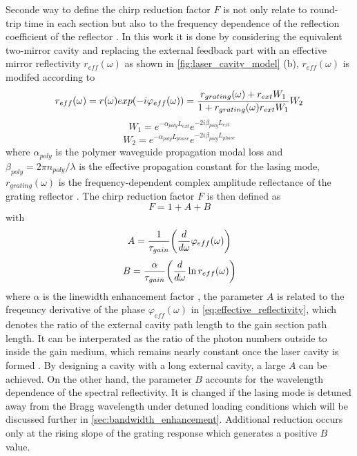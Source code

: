 Seconde way to define the chirp reduction factor $F$ is not only relate to round-trip time in each section but also to the frequency dependence of the reflection coefficient of the reflector \cite{petermann2012laser}. In this work it is done by considering the equivalent two-mirror cavity and replacing the external feedback part with an effective mirror reflectivity $r_{eff}(\omega)$ as shown in \autoref{fig:laser_cavity_model} (b), $r_{eff}(\omega)$ is modifed according to \cite{kazarinov1987relation, coldren2012diode, komljenovic2015widely}
\begin{equation}
    r_{eff}(\omega)=r(\omega)exp\qty(-i\varphi_{eff}(\omega))=\frac{r_{grating}(\omega)+r_{ext}W_1}{1+r_{grating}(\omega)r_{ext}W_1}W_2
    \label{eq:effective_reflectivity}
\end{equation}
\begin{equation}
    W_1=e^{-\alpha_{poly}L_{ext}}e^{-2i\beta_{poly}L_{ext}}
    \label{eq:propogation_external_cavity}
\end{equation}
\begin{equation}
    W_2=e^{-\alpha_{poly}L_{phase}}e^{-2i\beta_{poly}L_{phase}}
    \label{eq:propogation_polymer_wg}
\end{equation}
where $\alpha_{poly}$ is the polymer waveguide propagation modal loss and $\beta_{poly}=2\pi n_{poly}/\lambda$ is the effective propagation constant for the lasing mode, $r_{grating}(\omega)$ is the frequency-dependent complex amplitude reflectance of the grating reflector \cite{yariv1977periodic}.
The chirp reduction factor $F$ is then defined as \cite{kazarinov1987relation, petermann2012laser}
\begin{equation}
    F=1+A+B
    \label{eq:F_factor}
\end{equation}
with
\begin{equation}
    A=\frac{1}{\tau_{gain}}\qty(\dv{\omega}\varphi_{eff}(\omega))
    \label{eq:F_factor_A}
\end{equation}
\begin{equation}
    B=\frac{\alpha}{\tau_{gain}}\qty(\dv{\omega}\ln{r_{eff}(\omega)})
    \label{eq:F_factor_B}
\end{equation}
where $\alpha$ is the linewidth enhancement factor \cite{henry1982theory}, the parameter $A$ is related to the freqeuncy derivative of the phase $\varphi_{eff}(\omega)$ in \autoref{eq:effective_reflectivity}, which denotes the ratio of the external cavity path length to the gain section path length. It can be interperated as the ratio of the photon numbers outside to inside the gain medium, which remains nearly constant once the laser cavity is formed \cite{choi2015evaluation}. By designing a cavity with a long external cavity, a large $A$ can be achieved. On the other hand, the parameter $B$ accounts for the wavelength dependence of the spectral reflectivity. It is changed if the lasing mode is detuned away from the Bragg wavelength under detuned loading conditions \cite{} which will be discussed further in \autoref{sec:bandwidth_enhancement}. Additional reduction occurs only at the rising slope of the grating response which generates a positive $B$ value.

